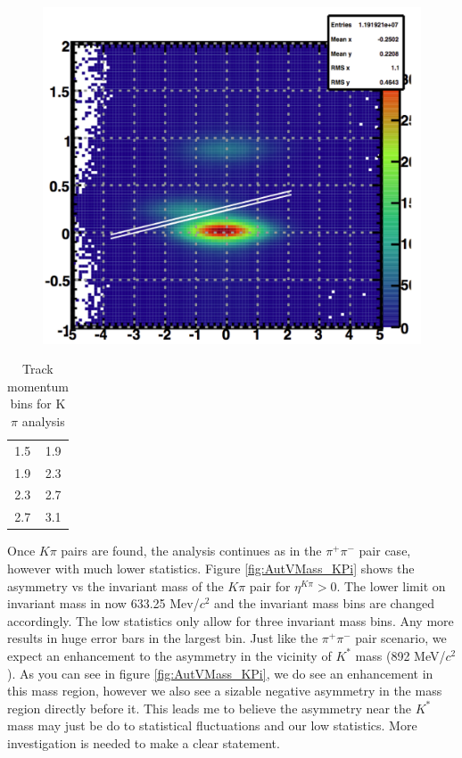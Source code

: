 \documentclass[abstract = on,listof=totoc, bibliography=totoc]{scrreprt}
\newcommand{\pip}{\pi^+}
\newcommand{\pim}{\pi^-}
\newcommand{\pair}{$\pip\pim$ }
\newcommand{\etakp}{\eta^{K\pi}}
\begin{document}
\begin{figure}
\begin{center}
\includegraphics[width = 1\textwidth]{tofnsigbiglines}
\caption[]{}
\label{fig:tofnsiglines}
\end{center}
\end{figure}
\begin{center}
\begin{table}[h!]
\caption{Track momentum bins for K$\pi$ analysis}
\begin{tabular}{cc} 
1.5 & 1.9 \\
1.9 & 2.3 \\
2.3 & 2.7 \\
2.7 & 3.1 \\
\end{tabular}
\label{tab:pBinsKpi}
\end{table}
\end{center}

Once $K\pi$ pairs are found, the analysis continues as in the \pair pair case, however with much lower statistics. Figure \ref{fig:AutVMass_KPi} shows the asymmetry vs the invariant mass of the $K\pi$ pair for $\etakp > 0$. The lower limit on invariant mass in now 633.25 Mev/$c^2$ and the invariant mass bins are changed accordingly. The low statistics only allow for three invariant mass bins. Any more results in huge error bars in the largest bin. Just like the \pair pair scenario, we expect an enhancement to the asymmetry in the vicinity of $K^*$ mass (892 MeV/$c^2$). As you can see in figure \ref{fig:AutVMass_KPi}, we do see an enhancement in this mass region, however we also see a sizable negative asymmetry in the mass region directly before it. This leads me to believe the asymmetry near the $K^*$ mass may just be do to statistical fluctuations and our low statistics. More investigation is needed to make a clear statement. 
\end{document}
